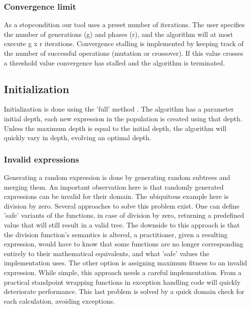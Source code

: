 \subsubsection{Convergence limit}
As a stopcondition our tool uses a preset number of iterations. The user specifies the number of generations (g) and phases (r), and the algorithm will at most execute g x r iterations. Convergence stalling is implemented by keeping track of the number of successful operations (mutation or crossover). If this value crosses a threshold value convergence has stalled and the algorithm is terminated.


\subsection{Initialization}
Initialization is done using the 'full' method \cite{GP}. The algorithm has a parameter initial depth, each new expression in the population is created using that depth. Unless the maximum depth is equal to the initial depth, the algorithm will quickly vary in depth, evolving an optimal depth. 
 
\subsubsection{Invalid expressions}\label{subsubinvalidexpressions}
Generating a random expression is done by generating random subtrees and merging them. An important observation here is that randomly generated expressions can be invalid for their domain. The ubiquitous example here is division by zero. Several approaches to solve this problem exist. One can define 'safe' variants of the functions, in case of division by zero, returning a predefined value that will still result in a valid tree. The downside to this approach is that the division function's semantics is altered, a practitioner, given a resulting expression, would have to know that some functions are no longer corresponding entirely to their mathematical equivalents, and what 'safe' values the implementation uses.
The other option is assigning maximum fitness to an invalid expression. While simple, this approach needs a careful implementation. From a practical standpoint wrapping functions in exception handling code will quickly deteriorate performance. 
This last problem is solved by a quick domain check for each calculation, avoiding exceptions. 

